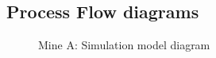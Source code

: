 \begin{appendices}
	\renewcommand{\thechapter}{\Roman{chapter}}
\chapter{Process Flow diagrams}\label{Schematics}
\newpage
	
	\begin{figure}[h!]
		\centering
		\caption{Mine A: Simulation model diagram}
		\label{fig: BEET Baseline model}
	\end{figure}


\end{appendices}
